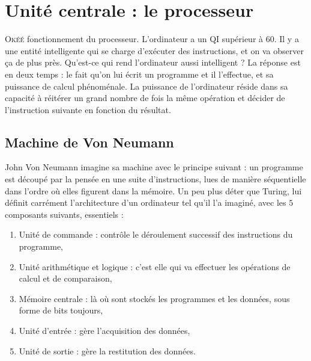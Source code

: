 \documentclass[12pt,a4paper]{report}
\begin{document}
\chapter{Unité centrale : le processeur}
\textsc{Okéé} fonctionnement du processeur. L'ordinateur a un QI supérieur à 60. Il y a une entité intelligente qui se charge d'exécuter des instructions, et on va observer ça de plus près. Qu'est-ce qui rend l'ordinateur aussi intelligent ? La réponse est en deux temps : le fait qu'on lui écrit un programme et il l'effectue, et sa puissance de calcul phénoménale. La puissance de l'ordinateur réside dans sa capacité à réitérer un grand nombre de fois la même opération et décider de l'instruction suivante en fonction du résultat.
\section{Machine de Von Neumann}
John Von Neumann imagine sa machine avec le principe suivant : un programme est découpé par la pensée en une suite d'instructions, lues de manière séquentielle dans l'ordre où elles figurent dans la mémoire. Un peu plus déter que Turing, lui définit carrément l'architecture d'un ordinateur tel qu'il l'a imaginé, avec les \underline{$5$} composants suivants, essentiels :
\begin{enumerate}
\item Unité de commande : contrôle le déroulement successif des instructions du programme, 
\item Unité arithmétique et logique : c'est elle qui va effectuer les opérations de calcul et de comparaison,
\item Mémoire centrale : là où sont stockés les programmes et les données, sous forme de bits toujours,
\item Unité d'entrée : gère l'acquisition des données,
\item Unité de sortie : gère la restitution des données.
\end{enumerate}
\end{document}
